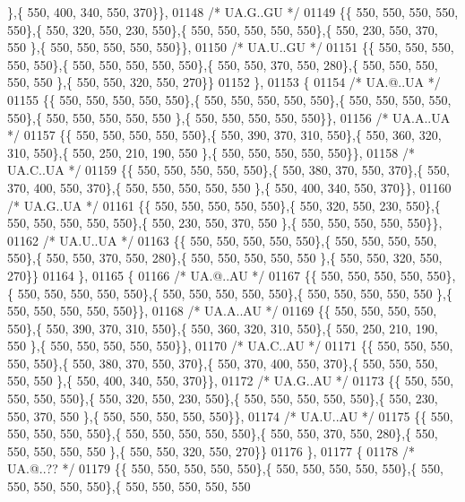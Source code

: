 \begin{DoxyCode}
      \},\{ 550, 400, 340, 550, 370\}\},
01148 \textcolor{comment}{/* UA.G..GU */}
01149 \{\{ 550, 550, 550, 550, 550\},\{ 550, 320, 550, 230, 550\},\{ 550, 550, 550, 550, 550\},\{ 550, 230, 550, 370, 550
      \},\{ 550, 550, 550, 550, 550\}\},
01150 \textcolor{comment}{/* UA.U..GU */}
01151 \{\{ 550, 550, 550, 550, 550\},\{ 550, 550, 550, 550, 550\},\{ 550, 550, 370, 550, 280\},\{ 550, 550, 550, 550, 550
      \},\{ 550, 550, 320, 550, 270\}\}
01152 \},
01153 \{
01154 \textcolor{comment}{/* UA.@..UA */}
01155 \{\{ 550, 550, 550, 550, 550\},\{ 550, 550, 550, 550, 550\},\{ 550, 550, 550, 550, 550\},\{ 550, 550, 550, 550, 550
      \},\{ 550, 550, 550, 550, 550\}\},
01156 \textcolor{comment}{/* UA.A..UA */}
01157 \{\{ 550, 550, 550, 550, 550\},\{ 550, 390, 370, 310, 550\},\{ 550, 360, 320, 310, 550\},\{ 550, 250, 210, 190, 550
      \},\{ 550, 550, 550, 550, 550\}\},
01158 \textcolor{comment}{/* UA.C..UA */}
01159 \{\{ 550, 550, 550, 550, 550\},\{ 550, 380, 370, 550, 370\},\{ 550, 370, 400, 550, 370\},\{ 550, 550, 550, 550, 550
      \},\{ 550, 400, 340, 550, 370\}\},
01160 \textcolor{comment}{/* UA.G..UA */}
01161 \{\{ 550, 550, 550, 550, 550\},\{ 550, 320, 550, 230, 550\},\{ 550, 550, 550, 550, 550\},\{ 550, 230, 550, 370, 550
      \},\{ 550, 550, 550, 550, 550\}\},
01162 \textcolor{comment}{/* UA.U..UA */}
01163 \{\{ 550, 550, 550, 550, 550\},\{ 550, 550, 550, 550, 550\},\{ 550, 550, 370, 550, 280\},\{ 550, 550, 550, 550, 550
      \},\{ 550, 550, 320, 550, 270\}\}
01164 \},
01165 \{
01166 \textcolor{comment}{/* UA.@..AU */}
01167 \{\{ 550, 550, 550, 550, 550\},\{ 550, 550, 550, 550, 550\},\{ 550, 550, 550, 550, 550\},\{ 550, 550, 550, 550, 550
      \},\{ 550, 550, 550, 550, 550\}\},
01168 \textcolor{comment}{/* UA.A..AU */}
01169 \{\{ 550, 550, 550, 550, 550\},\{ 550, 390, 370, 310, 550\},\{ 550, 360, 320, 310, 550\},\{ 550, 250, 210, 190, 550
      \},\{ 550, 550, 550, 550, 550\}\},
01170 \textcolor{comment}{/* UA.C..AU */}
01171 \{\{ 550, 550, 550, 550, 550\},\{ 550, 380, 370, 550, 370\},\{ 550, 370, 400, 550, 370\},\{ 550, 550, 550, 550, 550
      \},\{ 550, 400, 340, 550, 370\}\},
01172 \textcolor{comment}{/* UA.G..AU */}
01173 \{\{ 550, 550, 550, 550, 550\},\{ 550, 320, 550, 230, 550\},\{ 550, 550, 550, 550, 550\},\{ 550, 230, 550, 370, 550
      \},\{ 550, 550, 550, 550, 550\}\},
01174 \textcolor{comment}{/* UA.U..AU */}
01175 \{\{ 550, 550, 550, 550, 550\},\{ 550, 550, 550, 550, 550\},\{ 550, 550, 370, 550, 280\},\{ 550, 550, 550, 550, 550
      \},\{ 550, 550, 320, 550, 270\}\}
01176 \},
01177 \{
01178 \textcolor{comment}{/* UA.@..?? */}
01179 \{\{ 550, 550, 550, 550, 550\},\{ 550, 550, 550, 550, 550\},\{ 550, 550, 550, 550, 550\},\{ 550, 550, 550, 550, 550

\end{DoxyCode}
